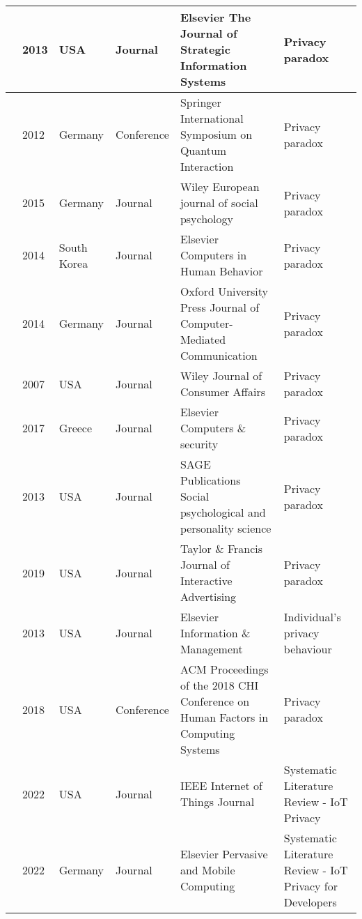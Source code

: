 \begin{table}
\begin{center}
\begin{longtable}{p{1.2cm} p{1cm} p{1.5cm} p{3.2cm} p{5cm} p{3cm}}
            \hline
            \cite{wakefield2013influence} & 2013 & USA & Journal & Elsevier The Journal of Strategic Information Systems & Privacy paradox \\
            \hline
            \cite{flender2012type} & 2012 & Germany & Conference & Springer International Symposium on Quantum Interaction & Privacy paradox \\
            \hline
            \cite{dienlin2015privacy} & 2015 & Germany & Journal & Wiley European journal of social psychology & Privacy paradox \\
            \hline
            \cite{baek2014solving} & 2014 & South Korea & Journal & Elsevier Computers in Human Behavior & Privacy paradox \\
            \hline
            \cite{taddicken2014privacy} & 2014 & Germany & Journal & Oxford University Press Journal of Computer-Mediated Communication & Privacy paradox \\
            \hline
            \cite{norberg2007privacy} & 2007 & USA & Journal & Wiley Journal of Consumer Affairs & Privacy paradox \\
            \hline
            \cite{kokolakis2017privacy} & 2017 & Greece & Journal & Elsevier Computers \& security & Privacy paradox \\
            \hline
            \cite{brandimarte2013misplaced} & 2013 & USA & Journal & SAGE Publications Social psychological and personality science & Privacy paradox \\
            \hline
            \cite{xie2019consumers} & 2019 & USA & Journal & Taylor \& Francis Journal of Interactive Advertising & Privacy paradox \\
            \hline
            \cite{SCHWAIG20131} & 2013 & USA & Journal & Elsevier Information \& Management & Individual's privacy behaviour \\
            \hline
            \cite{sannon2018privacy} & 2018 & USA & Conference & ACM Proceedings of the 2018 CHI Conference on Human Factors in Computing Systems & Privacy paradox \\
            \hline
            \cite{Gupta2022Privacy} & 2022 & USA & Journal & IEEE Internet of Things Journal & Systematic Literature Review - IoT Privacy \\
            \hline
            \cite{Kuhtreiber2022survey} & 2022 & Germany & Journal & Elsevier Pervasive and Mobile Computing & Systematic Literature Review - IoT Privacy for Developers \\

\end{longtable}
\end{center}
\end{table}
